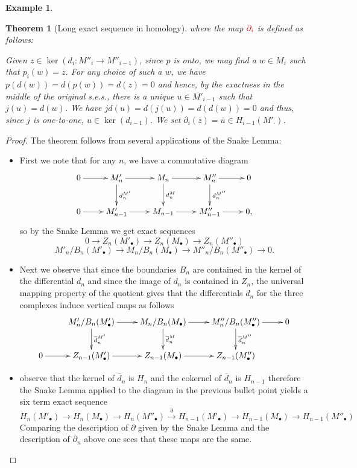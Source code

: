 \documentclass{amsart}[12pt]
\def\ker{\operatorname{ker}}
\def\ov#1{{\overline{#1}}}
\numberwithin{equation}{section}
\theoremstyle{plain} %
\newtheorem{thm}[equation]{Theorem}
\theoremstyle{definition}
\newtheorem{ex}[equation]{Example}
\theoremstyle{remark}
\newcommand{\xra}[1]{\xrightarrow{#1}}
\def\ov#1{\overline{#1}}
\begin{document}
\begin{ex}
\begin{thm}[Long exact sequence in homology]
      where the map $\color{red}{\partial_i}$ is defined as follows: 
      
      Given $z \in \ker(d_i: M''_i \to M''_{i-1})$,
 since $p$ is onto,     we may find a $w \in M_i$ such that $p_i(w) = z$. For any choice of such a $w$, we have
 $p(d(w)) = d(p(w)) = d(z) = 0$ and hence, by the exactness in the middle of the original s.e.s.,
 there is a unique $u \in M'_{i-1}$ such that $j(u) = d(w)$.
      We have $j d(u) = d(j(u)) = d(d(w)) = 0$ and thus, since $j$ is one-to-one, $u \in \ker(d_{i-1})$. 
      We set $\partial_i(\overline{z}) = \overline{u} \in H_{i-1}(M'_\cdot)$.
\end{thm}
\begin{proof}

The theorem follows from several applications of the Snake Lemma:
\begin{itemize}
\item First we note that for any $n$, we have  a commutative diagram
\[ \xymatrix{ 0 \ar[r] & M'_n \ar[r]\ar[d]^{d_n^{M'}} & M_n \ar[r]\ar[d]^{d_n^{M}}& M''_n \ar[r]\ar[d]^{d_n^{M''}}  & 0
\\  0 \ar[r] & M'_{n-1} \ar[r] & M_{n-1} \ar[r] & M''_{n-1} \ar[r] & 0, } \]
so by the Snake Lemma we get exact sequences
\[0\to Z_n(M'_\bullet)\to  Z_n(M_\bullet) \to  Z_n(M''_\bullet)\]
\[M'_n/B_n (M'_\bullet) \to M_n/B_n (M_\bullet) \to M''_n/B_n (M''_\bullet) \to 0 .\]
\item Next we observe that since the boundaries $B_n$ are contained in the kernel of the differential $d_{n}$ and since the image of $d_{n}$ is contained in $Z_n$, the universal mapping property of the quotient gives that the differentials $d_n$ for the three complexes induce vertical maps as follows
\[
\xymatrix{
& M'_n/B_n (M'_\bullet) \ar[r] \ar[d]^{\ov{d}_n^{M'}} &M_n/B_n (M_\bullet) \ar[r] \ar[d]^{\ov{d}_n^{M}} &M''_n/B_n (M''_\bullet) \ar[r] \ar[d]^{\ov{d}_n^{M''}} &0\\
0\ar[r] & Z_{n-1}(M'_\bullet)\ar[r] &  Z_{n-1}(M_\bullet) \ar[r]&  Z_{n-1}(M''_\bullet) 
}
\]
\item observe that the kernel of $\ov{d}_n$ is $H_n$ and the cokernel of $\ov{d}_n$ is $H_{n-1}$ therefore the Snake Lemma applied to the diagram in the previous bullet point yields a six term exact sequence
\[
H_n(M'_\bullet) \to H_n(M_\bullet) \to H_n(M''_\bullet) \xra{\partial} H_{n-1}(M'_\bullet) \to H_{n-1}(M_\bullet) \to H_{n-1}(M''_\bullet)
\]
Comparing the description of $\partial$ given by the Snake Lemma and the description of $\partial_n$ above one sees that these maps are the same.\qedhere
\end{itemize}
\end{proof}


\end{ex}
\end{document}
